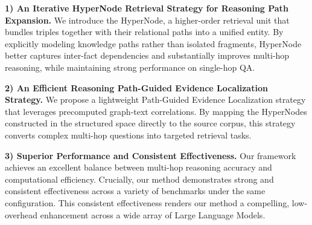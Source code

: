 \textbf{1) An Iterative HyperNode Retrieval Strategy for Reasoning Path Expansion.} We introduce the HyperNode, a higher-order retrieval unit that bundles triples together with their relational paths into a unified entity. By explicitly modeling knowledge paths rather than isolated fragments, HyperNode better captures inter-fact dependencies and substantially improves multi-hop reasoning, while maintaining strong performance on single-hop QA.
    

\textbf{2) An Efficient Reasoning Path-Guided Evidence Localization Strategy.} 
We propose a lightweight Path-Guided Evidence Localization strategy that leverages precomputed graph-text correlations. 
By mapping the HyperNodes constructed in the structured space directly to the source corpus, this strategy converts complex multi-hop questions into targeted retrieval tasks. 



\textbf{3) Superior Performance and Consistent Effectiveness.} Our framework achieves an excellent balance between multi-hop reasoning accuracy and computational efficiency. Crucially, our method demonstrates strong and consistent effectiveness across a variety of benchmarks under the same configuration. This consistent effectiveness renders our method a compelling, low-overhead enhancement across a wide array of Large Language Models.